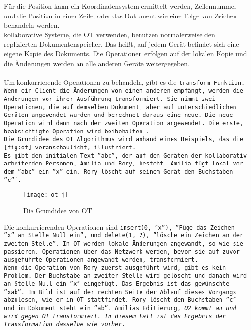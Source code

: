 Für die Position kann ein Koordinatensystem ermittelt werden, Zeilennummer und die Position in einer Zeile, oder das Dokument wie eine Folge von Zeichen behandeln werden.\\
%
\Gls{kollaborativ}e Systeme, die \gls{OT} verwenden, benutzen normalerweise den replizierten Dokumentenspeicher.
Das heißt, auf jedem Gerät befindet sich eine eigene Kopie des Dokuments.
Die Operationen erfolgen auf der lokalen Kopie und die Änderungen werden an alle anderen Geräte weitergegeben.\\\\
%
Um konkurrierende Operationen zu behandeln, gibt es die \tt{transform} Funktion.
Wenn ein Client die Änderungen von einem anderen empfängt, werden die Änderungen vor ihrer Ausführung transformiert.
Sie nimmt zwei Operationen, die auf demselben Dokument, aber auf unterschiedlichen Geräten angewendet wurden und berechnet daraus eine neue.
Die neue Operation wird dann nach der zweiten Operation angewendet. Die erste, beabsichtigte Operation wird beibehalten~\cite{ot_paper}.\\
%
Die Grundidee des \gls{OT} Algorithmus wird anhand eines Beispiels, das die \autoref{fig:ot} veranschaulicht, illustriert.\\
Es gibt den initialen Text ''abc'', der auf den Geräten der kollaborativ arbeitenden Personen, Amilia und Rory, besteht.
Amilia fügt lokal vor dem ''abc'' ein ''x'' ein, Rory löscht auf seinem Gerät den Buchstaben ''c'''.
%
\begin{figure}[h]
  \centering
  \texttt{[image: ot-j]}
  \grayRule
  \caption{Die Grundidee von \gls{OT}}
  \label{fig:ot}
\end{figure}
%
Die konkurrierenden Operationen sind \tt{insert(0, ''x'')}, ''Füge das Zeichen ''x'' an Stelle Null ein'', und \tt{delete(1, 2)}, ''lösche ein Zeichen an der zweiten Stelle''.
In \gls{OT} werden lokale Änderungen angewandt, so wie sie passieren.
Operationen über das Netzwerk werden, bevor sie auf zuvor ausgeführte Operationen angewandt werden, transformiert.\\
%
Wenn die Operation von Rory zuerst ausgeführt wird, gibt es kein Problem. Der Buchstabe an zweiter Stelle wird gelöscht und danach wird an Stelle Null ein ''x'' eingefügt. Das Ergebnis ist das gewünschte ''xab''.
Im Bild ist auf der rechten Seite der Ablauf dieses Vorgangs abzulesen, wie er in \gls{OT} stattfindet.
Rory löscht den Buchstaben ''c'' und im Dokument steht ein ''ab''.
Amilias Editierung, \it{O2} kommt an und wird gegen \it{O1} transformiert. In diesem Fall ist das Ergebnis der Transformation dasselbe wie vorher.
